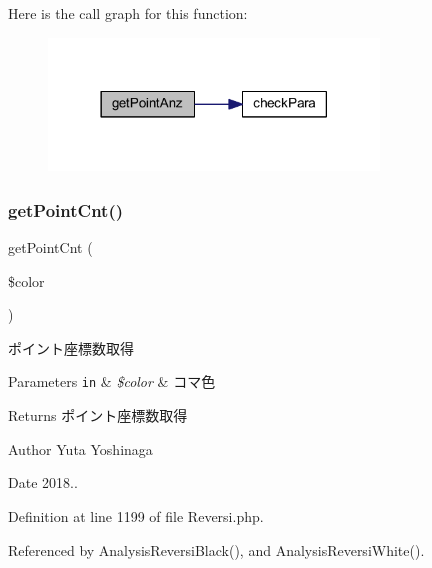 Here is the call graph for this function\+:\nopagebreak
\begin{figure}[H]
\begin{center}
\leavevmode
\includegraphics[width=249pt]{class_reversi_af1a30d438a7d17f31353b9d4bfe9cb65_cgraph}
\end{center}
\end{figure}
\mbox{\label{class_reversi_af538d04718f177f71461f582f3bd8eba}} 
\subsubsection{\texorpdfstring{get\+Point\+Cnt()}{getPointCnt()}}
{\footnotesize\ttfamily get\+Point\+Cnt (\begin{DoxyParamCaption}\item[{}]{\$color }\end{DoxyParamCaption})}



ポイント座標数取得 


\begin{DoxyParams}[1]{Parameters}
\mbox{\tt in}  & {\em \$color} & コマ色 \\
\hline
\end{DoxyParams}
\begin{DoxyReturn}{Returns}
ポイント座標数取得 
\end{DoxyReturn}
\begin{DoxyAuthor}{Author}
Yuta Yoshinaga 
\end{DoxyAuthor}
\begin{DoxyDate}{Date}
2018.. 
\end{DoxyDate}


Definition at line 1199 of file Reversi.\+php.



Referenced by Analysis\+Reversi\+Black(), and Analysis\+Reversi\+White().

